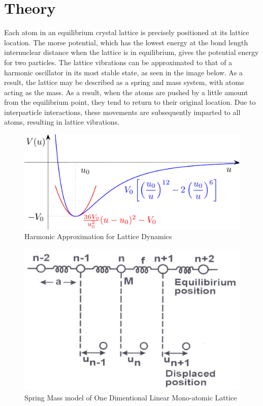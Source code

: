 \section{Theory}
	Each atom in an equilibrium crystal lattice is precisely positioned at its lattice location. The morse potential, which has the lowest energy at the bond length internuclear distance when the lattice is in equilibrium, gives the potential energy for two particles. The lattice vibrations can be approximated to that of a harmonic oscillator in its most stable state, as seen in the image below. As a result, the lattice may be described as a spring and mass system, with atoms acting as the mass. As a result, when the atoms are pushed by a little amount from the equilibrium point, they tend to return to their original location. Due to interparticle interactions, these movements are subsequently imparted to all atoms, resulting in lattice vibrations.

	\begin{figure}[h]
		\centering
		\includegraphics[width=0.9\columnwidth]{images/theory1.png}
		\caption{Harmonic Approximation for Lattice
		Dynamics}
		\label{fig:theory1}
	\end{figure}

	\begin{figure}[h]
		\centering
		\includegraphics[width=0.9\columnwidth]{images/theory2.png}
		\caption{Spring Mass model of One Dimentional Linear Mono-atomic Lattice}
		\label{fig:theory2}
	\end{figure}

